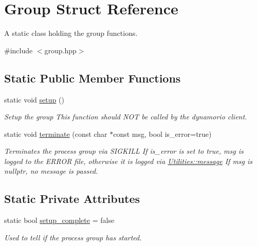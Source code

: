 \hypertarget{struct_group}{}\section{Group Struct Reference}
\label{struct_group}


A static class holding the group functions.  




{\ttfamily \#include $<$group.\+hpp$>$}

\subsection*{Static Public Member Functions}
\begin{DoxyCompactItemize}
\item 
static void \hyperlink{struct_group_a9e2d7e0c56696de4592f1b166188c10a}{setup} ()
\begin{DoxyCompactList}\small\item\em Setup the group This function should N\+OT be called by the dynamorio client. \end{DoxyCompactList}\item 
static void \hyperlink{struct_group_a3538b661d252144dab134aa5aba74b18}{terminate} (const char $\ast$const msg, bool is\+\_\+error=true)
\begin{DoxyCompactList}\small\item\em Terminates the process group via S\+I\+G\+K\+I\+LL If is\+\_\+error is set to true, msg is logged to the E\+R\+R\+OR file, otherwise it is logged via \hyperlink{class_utilities_ae8efd2e8950fe6641d87296b8120d246}{Utilities\+::message} If msg is nullptr, no message is passed. \end{DoxyCompactList}\end{DoxyCompactItemize}
\subsection*{Static Private Attributes}
\begin{DoxyCompactItemize}
\item 
static bool \hyperlink{struct_group_a35632ca452cfe09fbf723539cd264f58}{setup\+\_\+complete} = false
\begin{DoxyCompactList}\small\item\em Used to tell if the process group has started. \end{DoxyCompactList}\end{DoxyCompactItemize}


